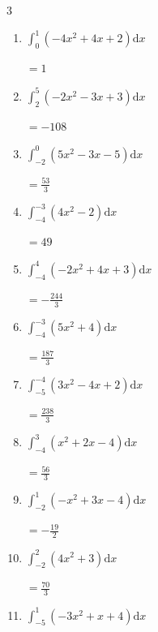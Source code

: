 \begin{multicols}{3}
\begin{enumerate}
        $\displaystyle =35$

  \item $\displaystyle \int_{0}^{1}\left( -4x^{2}+4x+2 \right) \mathrm{d}x$

        $\displaystyle =1$

\columnbreak %

\resetques

  \item $\displaystyle \int_{2}^{5}\left( -2x^{2}-3x+3 \right) \mathrm{d}x$

        $\displaystyle =-108$

  \item $\displaystyle \int_{-2}^{0}\left( 5x^{2}-3x-5 \right) \mathrm{d}x$

        $\displaystyle =\frac{53}{3}$

  \item $\displaystyle \int_{-4}^{-3}\left( 4x^{2}-2 \right) \mathrm{d}x$

        $\displaystyle =49$

  \item $\displaystyle \int_{-4}^{4}\left( -2x^{2}+4x+3 \right) \mathrm{d}x$

        $\displaystyle =-\frac{244}{3}$

  \item $\displaystyle \int_{-4}^{-3}\left( 5x^{2}+4 \right) \mathrm{d}x$

        $\displaystyle =\frac{187}{3}$

\columnbreak %

  \item $\displaystyle \int_{-5}^{-4}\left( 3x^{2}-4x+2 \right) \mathrm{d}x$

        $\displaystyle =\frac{238}{3}$

  \item $\displaystyle \int_{-4}^{3}\left( x^{2}+2x-4 \right) \mathrm{d}x$

        $\displaystyle =\frac{56}{3}$

  \item $\displaystyle \int_{-2}^{1}\left( -x^{2}+3x-4 \right) \mathrm{d}x$

        $\displaystyle =-\frac{19}{2}$

  \item $\displaystyle \int_{-2}^{2}\left( 4x^{2}+3 \right) \mathrm{d}x$

        $\displaystyle =\frac{70}{3}$

  \item $\displaystyle \int_{-5}^{1}\left( -3x^{2}+x+4 \right) \mathrm{d}x$


\end{enumerate}
\end{multicols}
